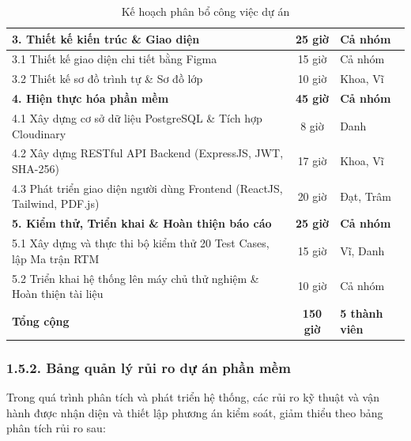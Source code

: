\begin{table}[H]
\begin{tabularx}{\textwidth}{|X|c|p{3.2cm}|}
\hline
\textbf{3. Thiết kế kiến trúc \& Giao diện} & \textbf{25 giờ} & \textbf{Cả nhóm} \\
\hline
\hspace{0.3cm} 3.1 Thiết kế giao diện chi tiết bằng Figma & 15 giờ & Cả nhóm \\
\hline
\hspace{0.3cm} 3.2 Thiết kế sơ đồ trình tự \& Sơ đồ lớp & 10 giờ & Khoa, Vĩ \\
\hline
\textbf{4. Hiện thực hóa phần mềm} & \textbf{45 giờ} & \textbf{Cả nhóm} \\
\hline
\hspace{0.3cm} 4.1 Xây dựng cơ sở dữ liệu PostgreSQL \& Tích hợp Cloudinary & 8 giờ & Danh \\
\hline
\hspace{0.3cm} 4.2 Xây dựng RESTful API Backend (ExpressJS, JWT, SHA-256) & 17 giờ & Khoa, Vĩ \\
\hline
\hspace{0.3cm} 4.3 Phát triển giao diện người dùng Frontend (ReactJS, Tailwind, PDF.js) & 20 giờ & Đạt, Trâm \\
\hline
\textbf{5. Kiểm thử, Triển khai \& Hoàn thiện báo cáo} & \textbf{25 giờ} & \textbf{Cả nhóm} \\
\hline
\hspace{0.3cm} 5.1 Xây dựng và thực thi bộ kiểm thử 20 Test Cases, lập Ma trận RTM & 15 giờ & Vĩ, Danh \\
\hline
\hspace{0.3cm} 5.2 Triển khai hệ thống lên máy chủ thử nghiệm \& Hoàn thiện tài liệu & 10 giờ & Cả nhóm \\
\hline
\rowcolor[HTML]{F0F0F0}
\textbf{Tổng cộng} & \textbf{150 giờ} & \textbf{5 thành viên} \\
\hline
\end{tabularx}
\caption{Kế hoạch phân bổ công việc dự án}
\label{tab:ke_hoach_wbs}
\end{table}

\subsubsection{1.5.2. Bảng quản lý rủi ro dự án phần mềm}
Trong quá trình phân tích và phát triển hệ thống, các rủi ro kỹ thuật và vận hành được nhận diện và thiết lập phương án kiểm soát, giảm thiểu theo bảng phân tích rủi ro sau:

